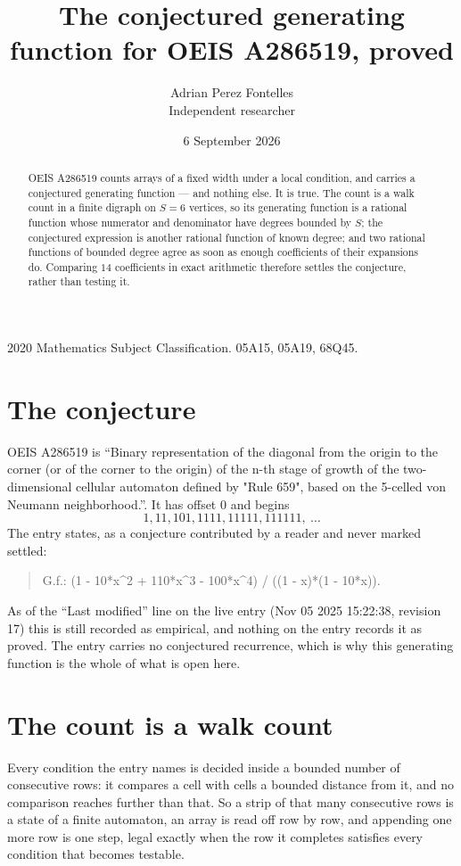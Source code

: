 \documentclass[11pt,a4paper]{article}
\title{The conjectured generating function for OEIS A286519, proved}
\author{Adrian Perez Fontelles\\ \small Independent researcher}
\date{6 September 2026}
\theoremstyle{plain}
\theoremstyle{definition}
\begin{document}
\maketitle

\begin{abstract}
OEIS A286519 counts arrays of a fixed width under a local condition, and carries a conjectured
generating function --- and nothing else. It is true. The count is a walk count in a finite
digraph on $S=6$ vertices, so its generating function is a rational function whose numerator
and denominator have degrees bounded by $S$; the conjectured expression is another rational
function of known degree; and two rational functions of bounded degree agree as soon as enough
coefficients of their expansions do. Comparing $14$ coefficients in exact arithmetic
therefore settles the conjecture, rather than testing it.
\end{abstract}

\noindent\small 2020 Mathematics Subject Classification. 05A15, 05A19, 68Q45.\normalsize

\section{The conjecture}

OEIS A286519 is ``Binary representation of the diagonal from the origin to the corner (or of the corner to the origin) of the n-th stage of growth of the two-dimensional cellular automaton defined by "Rule 659", based on the 5-celled von Neumann neighborhood.''. It has offset $0$ and begins
\[
1, 11, 101, 1111, 11111, 111111,\ \dots
\]
The entry states, as a conjecture contributed by a reader and never marked settled:
\begin{quote}
G.f.: (1 - 10*x\^{}2 + 110*x\^{}3 - 100*x\^{}4) / ((1 - x)*(1 - 10*x)).
\end{quote}
As of the ``Last modified'' line on the live entry (Nov 05 2025 15:22:38, revision 17) this is still
recorded as empirical, and nothing on the entry records it as proved. The entry carries no
conjectured recurrence, which is why this generating function is the whole of what is open
here.

\section{The count is a walk count}

Every condition the entry names is decided inside a bounded number of consecutive rows: it
compares a cell with cells a bounded distance from it, and no comparison reaches further than
that. So a strip of that many consecutive rows is a state of a finite automaton, an array is
read off row by row, and appending one more row is one step, legal exactly when the row it
completes satisfies every condition that becomes testable.
\end{document}
